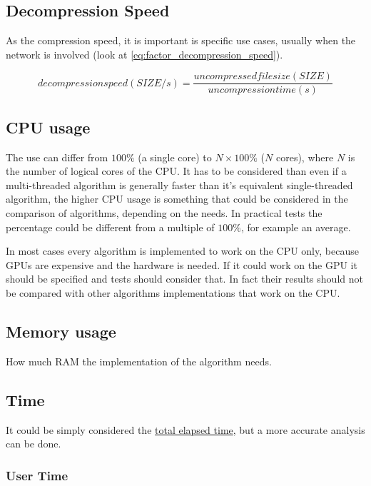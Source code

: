 \documentclass[12pt, a4paper]{report}
\begin{document}
\subsection{Decompression Speed}

As the compression speed, it is important is specific use cases, usually when the network is involved (look at
\autoref{eq:factor_decompression_speed}).

\begin{equation} \label{eq:factor_decompression_speed}
  decompression speed (SIZE / s) = \frac{uncompressed file size (SIZE)}{uncompression time (s)}
\end{equation}

\subsection{CPU usage}

The use can differ from \(100 \%\) (a single core) to \(N \times 100 \%\) (\(N\) cores), where \(N\) is the number of logical
cores of the CPU.
It has to be considered than even if a multi-threaded algorithm is generally faster than it's equivalent single-threaded
algorithm, the higher CPU usage is something that could be considered in the comparison of algorithms, depending on the needs.
In practical tests the percentage could be different from a multiple of \(100 \%\), for example an average.

In most cases every algorithm is implemented to work on the CPU only, because GPUs are expensive and the hardware is needed.
If it could work on the GPU it should be specified and tests should consider that.
In fact their results should not be compared with other algorithms implementations that work on the CPU.

\subsection{Memory usage}

How much RAM the implementation of the algorithm needs.

\subsection{Time}

It could be simply considered the \hyperref[subsubsec:wall_time]{total elapsed time}, but a more accurate analysis can be done.

\subsubsection{User Time}
\label{subsubsec:user_time}
\end{document}
